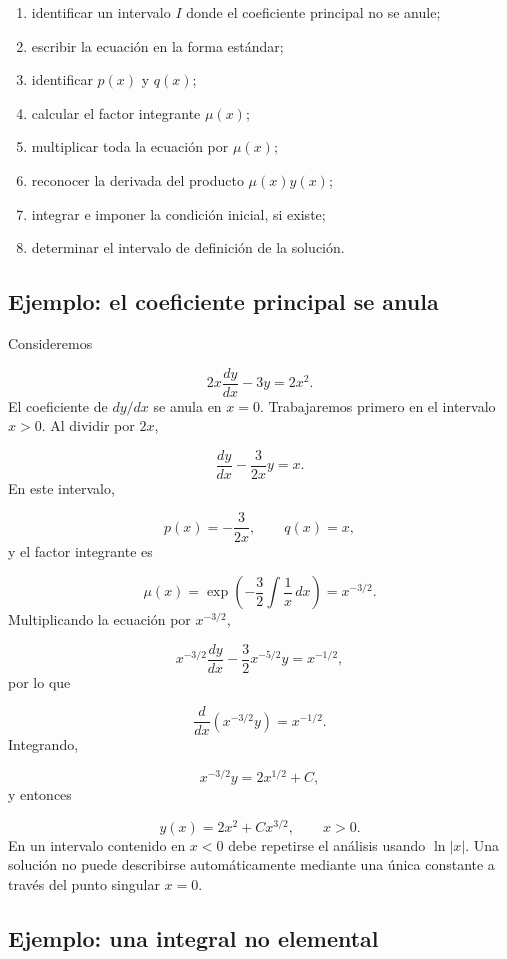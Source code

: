 \documentclass[12pt,a4paper]{article}
\begin{document}
	\begin{enumerate}[label=\arabic*.]
		\item identificar un intervalo \(I\) donde el coeficiente principal no se anule;
		\item escribir la ecuación en la forma estándar;
		\item identificar \(p(x)\) y \(q(x)\);
		\item calcular el factor integrante \(\mu(x)\);
		\item multiplicar toda la ecuación por \(\mu(x)\);
		\item reconocer la derivada del producto \(\mu(x)y(x)\);
		\item integrar e imponer la condición inicial, si existe;
		\item determinar el intervalo de definición de la solución.
	\end{enumerate}

	\clearpage
	\subsection{Ejemplo: el coeficiente principal se anula}

	Consideremos

	\[
	2x\frac{dy}{dx}-3y=2x^2.
	\]
	El coeficiente de \(dy/dx\) se anula en \(x=0\). Trabajaremos primero en el intervalo \(x>0\). Al dividir por \(2x\),

	\[
	\frac{dy}{dx}-\frac{3}{2x}y=x.
	\]
	En este intervalo,

	\[
	p(x)=-\frac{3}{2x},
	\qquad
	q(x)=x,
	\]
	y el factor integrante es

	\[
	\mu(x)
	=
	\exp\left(-\frac32\int\frac{1}{x}\,dx\right)
	=
	x^{-3/2}.
	\]
	Multiplicando la ecuación por \(x^{-3/2}\),

	\[
	x^{-3/2}\frac{dy}{dx}
	-
	\frac32x^{-5/2}y
	=
	x^{-1/2},
	\]
	por lo que

	\[
	\frac{d}{dx}\left(x^{-3/2}y\right)=x^{-1/2}.
	\]
	Integrando,

	\[
	x^{-3/2}y=2x^{1/2}+C,
	\]
	y entonces

	\[
	\boxed{y(x)=2x^2+Cx^{3/2},\qquad x>0.}
	\]
	En un intervalo contenido en \(x<0\) debe repetirse el análisis usando \(\ln|x|\). Una solución no puede describirse automáticamente mediante una única constante a través del punto singular \(x=0\).

	\subsection{Ejemplo: una integral no elemental}
\end{document}
